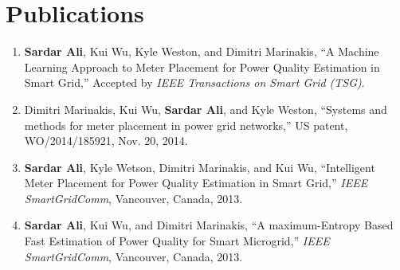 \chapter*{Publications}
\label{chap:publications}
\begin{enumerate}  
\item \textbf{Sardar Ali}, Kui Wu, Kyle Weston, and Dimitri Marinakis, ``A Machine Learning Approach to Meter Placement for Power Quality Estimation in Smart Grid,'' Accepted by \textit{IEEE Transactions on Smart Grid (TSG)}.

\item Dimitri Marinakis, Kui Wu, \textbf{Sardar Ali}, and Kyle Weston, ``Systems and methods for meter placement in power grid networks,'' US patent, WO/2014/185921, Nov. 20, 2014.

\item \textbf{Sardar Ali}, Kyle Wetson, Dimitri Marinakis, and Kui Wu, ``Intelligent Meter Placement for Power Quality Estimation in Smart Grid,'' \textit{IEEE SmartGridComm}, Vancouver, Canada, 2013.

\item \textbf{Sardar Ali}, Kui Wu, and Dimitri Marinakis, ``A maximum-Entropy Based Fast Estimation of Power Quality for Smart Microgrid,'' \textit{IEEE SmartGridComm}, Vancouver, Canada, 2013.
\end{enumerate}
